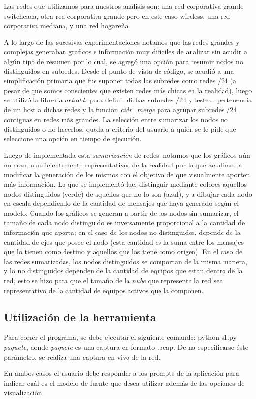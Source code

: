 Las redes que utilizamos para nuestros análisis son: una red corporativa grande switcheada, otra red corporativa grande pero en este caso wireless, una red corporativa mediana, y una red hogareña.

A lo largo de las sucesivas experimentaciones notamos que las redes grandes y complejas generaban graficos e información muy difíciles de analizar sin acudir a algún tipo de resumen por lo cual, se agregó una opción para resumir nodos no distinguidos en subredes. Desde el punto de vista de código, se acudió a una simplificación primaria que fue suponer todas las subredes como redes /24 (a pesar de que somos conscientes que existen redes más chicas en la realidad), luego se utilizó la libreria \textit{netaddr} para definir dichas subredes /24 y testear pertenencia de un host a dichas redes y la funcion \textit{cidr\_merge} para agrupar subredes /24 contiguas en redes más grandes. La selección entre sumarizar los nodos no distinguidos o no hacerlos, queda a criterio del usuario a quién se le pide que seleccione una opción en tiempo de ejecución.

Luego de implementada esta \textit{sumarización} de redes, notamos que los gráficos aún no eran lo suficientemente representativos de la realidad por lo que acudimos a modificar la generación de los mismos con el objetivo de que visualmente aporten más información. Lo que se implementó fue, distinguir mediante colores aquellos nodos distinguidos (verde) de aquellos que no lo son (azul), y a dibujar cada nodo en escala dependiendo de la cantidad de mensajes que haya generado según el modelo. Cuando los gráficos se generan a partir de los nodos sin sumarizar, el tamaño de cada nodo distinguido es inversamente proporcional a la cantidad de información que aporta; en el caso de los nodos no distinguidos, depende de la cantidad de ejes que posee el nodo (esta cantidad es la suma entre los mensajes que lo tienen como destino y aquellos que los tiene como origen). En el caso de las redes sumarizadas, los nodos distinguidos se comportan de la misma manera, y lo no distinguidos dependen de la cantidad de equipos que estan dentro de la red, esto se hizo para que el tamaño de la \textit{nube} que representa la red sea representativo de la cantidad de equipos activos que la componen.

\subsection{Utilización de la herramienta}
Para correr el programa, se debe ejecutar el siguiente comando: python s1.py \textit{paquete}, donde \textit{paquete} es una captura en formato .pcap. De no especificarse éste parámetro, se realiza una captura en vivo de la red.

En ambos casos el usuario debe responder a los prompts de la aplicación para indicar cuál es el modelo de fuente que desea utilizar además de las opciones de visualización.
